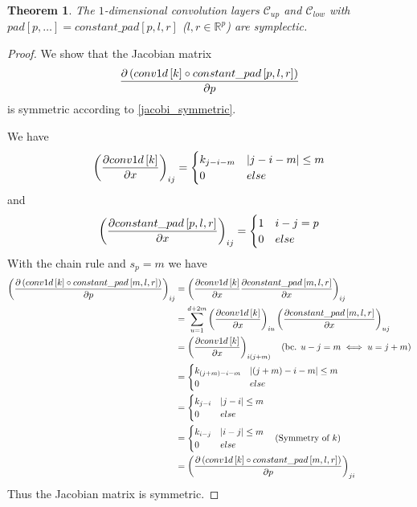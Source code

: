 \documentclass[twoside,a4paper]{article}
\newtheorem{theorem}{Theorem}
\begin{document}
\begin{theorem}
	The $1$-dimensional convolution layers $\mathcal{C}_{up}$ and $\mathcal{C}_{low}$
	with $pad[p,\dots] = constant\_pad[p,l,r]$ ($l,r \in \mathbb{R}^p$) are symplectic.
\end{theorem}
\begin{proof}
	We show that the Jacobian matrix 
	\begin{equation*}
		\frac{\partial \left( conv1d \left[ k \right] \circ constant\_pad \left[ p,l,r \right] \right)}{\partial p}
	\end{equation*}
	is symmetric according to \cref{jacobi_symmetric}.

	We have
	\begin{equation*}
		\left( \frac{\partial conv1d \left[ k \right]}{\partial x} \right)_{ij} = \begin{cases}
			k_{j-i-m} & \left|{j-i-m}\right| \leq m \\
			0 & else
		\end{cases}
	\end{equation*}
	and
	\begin{equation*}
		\left( \frac{\partial constant\_pad \left[ p,l,r \right]}{\partial x} \right)_{ij} = \begin{cases}
			1 & i-j=p \\
			0 & else
		\end{cases}
	\end{equation*}
	With the chain rule and $s_p = m$ we have
	\begin{align*}
		\left( \frac{\partial \left( conv1d \left[ k \right] \circ constant\_pad \left[ m,l,r \right] \right)}{\partial p} \right)_{ij}
		&= \left(  
			\frac{\partial conv1d \left[ k \right]}{\partial x}
			\frac{\partial constant\_pad \left[ m,l,r \right]}{\partial x} 
		\right)_{ij} \\
		&= \sum_{u=1}^{d+2m} \left( \frac{\partial conv1d \left[ k \right]}{\partial x} \right)_{iu}
		\left( \frac{\partial constant\_pad \left[ m,l,r \right]}{\partial x} \right)_{uj} \\
		&= \left( \frac{\partial conv1d \left[ k \right]}{\partial x} \right)_{i(j+m)}
		\quad (\text{bc. } u-j=m \iff u=j+m) \\
		&= \begin{cases}
			k_{(j+m)-i-m} & \left|{(j+m)-i-m}\right| \leq m \\
			0 & else
		\end{cases} \\
		&= \begin{cases}
			k_{j-i} & \left|{j-i}\right| \leq m \\
			0 & else
		\end{cases} \\
		&= \begin{cases}
			k_{i-j} & \left|{i-j}\right| \leq m \\
			0 & else
		\end{cases} \quad \text{(Symmetry of $k$)} \\
		&= \left( \frac{\partial \left( conv1d \left[ k \right] \circ constant\_pad \left[ m,l,r \right] \right)}{\partial p} \right)_{ji}
	\end{align*}
	Thus the Jacobian matrix is symmetric.
\end{proof}
\end{document}
